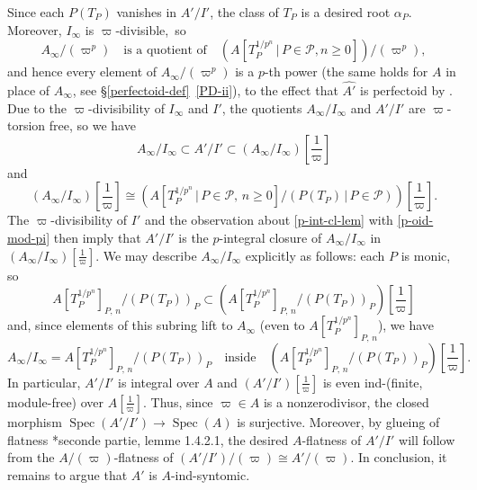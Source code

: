\documentclass[11pt, reqno]{amsart}
\newcommand{\gA}{\alpha}
\newcommand{\cP}{\mathcal{P}}
\DeclareMathOperator{\Spec}{Spec}		%
\providecommand{\p}[1]{\left(#1\right)}
\newcommand{\ra}{\rightarrow}
\newcommand{\wh}{\widehat}
\providecommand{\f}[2]{\frac{#1}{#2}}
\newcommand{\x}{\text}
\providecommand{\qxq}[1]{\quad\text{#1}\quad}
\newcommand{\q}{\quad}
\newcommand{\tst}{\textstyle}
\numberwithin{equation}{numberingbase}
\theoremstyle{thms}
\theoremstyle{claims}
\theoremstyle{defs}
\theoremstyle{thms}
\theoremstyle{defs}
\theoremstyle{subsection-tweak}
\theoremstyle{subsection-tweak}
\begin{document}
Since each $P(T_P)$ vanishes in $A'/I'$, the class of $T_P$ is a desired root $\gA_P$. Moreover, $I_\infty$ is $\varpi$-divisible,~so
\[
A_\infty/(\varpi^p) \q \x{is a quotient of} \q (A[T_P^{1/p^n} \, \vert\, P \in \cP, n \ge 0])/(\varpi^p),
\]
and hence every element of $A_\infty/(\varpi^p)$ is a $p$-th power (the same holds for $A$ in place of $A_\infty$, see \S\ref{perfectoid-def}~\ref{PD-ii}), to the effect that $\wh{A'}$ is perfectoid by . Due to the $\varpi$-divisibility of $I_\infty$ and $I'$, the quotients $A_\infty/I_\infty$ and $A'/I'$ are $\varpi$-torsion free, so we have
\[
\tst A_\infty/I_\infty \subset A'/I' \subset (A_\infty/I_\infty)[\f{1}{\varpi}] 
\]
and
\[
\tst (A_\infty/I_\infty)[\f{1}{\varpi}] \cong \p{A\left[T_P^{1/p^n} \, \big\vert\, P \in \cP,\, n \ge 0\right]/(P(T_P)\,  |\,  P \in \cP)}[\f{1}{\varpi}].
\]
The $\varpi$-divisibility of $I'$ and the observation about \eqref{p-int-cl-lem} with \eqref{p-oid-mod-pi} then imply that $A'/I'$ is the $p$-integral closure of $A_\infty/I_\infty$ in $(A_\infty/I_\infty)[\f{1}{\varpi}]$. We may describe $A_\infty/I_\infty$ explicitly as follows: each $P$ is monic, so 
\[
\tst A[T_P^{1/p^n}]_{P,\, n}/(P(T_P))_P \subset \p{A[T_P^{1/p^n} ]_{P,\, n}/(P(T_P))_P}[\f{1}{\varpi}]
\]
and, since  elements of this subring lift to $A_\infty$ (even to $A[T_P^{1/p^n}]_{P,\, n}$), we have 
\[
\tst A_\infty/I_\infty = A[T_P^{1/p^n}]_{P,\, n}/(P(T_P))_P \qxq{inside} \p{A[T_P^{1/p^n} ]_{P,\, n}/(P(T_P))_P}[\f{1}{\varpi}].
\]
In particular, $A'/I'$ is integral over $A$ %
and $(A'/I')[\f{1}{\varpi}]$ is even ind-(finite, module-free) over $A[\f{1}{\varpi}]$. Thus, since  $\varpi \in A$ is a nonzerodivisor, the closed morphism $\Spec(A'/I') \ra \Spec(A)$ is surjective. Moreover, by glueing of flatness \cite{RG71}*{seconde partie, lemme 1.4.2.1}, the desired $A$-flatness of $A'/I'$ will follow from the $A/(\varpi)$-flatness of $(A'/I')/(\varpi) \cong A'/(\varpi)$. In conclusion, it remains to argue that $A'$ is $A$-ind-syntomic.
\end{document}
